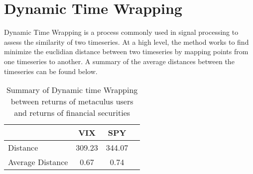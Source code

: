 \documentclass{article}
\begin{document}
\section*{Dynamic Time Wrapping}

Dynamic Time Wrapping is a process commonly used in signal processing to assess the similarity of two timeseries. At a high level, the method works to find minimize the euclidian distance between two timeseries by mapping points from one timeseries to another. A summary of the average distances between the timeseries can be found below.

\begin{table}[h]
    \centering
\begin{tabular}{l||ccc}
    \toprule
     & \textbf{VIX} & \textbf{SPY} & \\
    \midrule
    Distance & 309.23 & 344.07 \\
    Average Distance & 0.67 & 0.74\\
    \bottomrule
\end{tabular}
\caption{Summary of Dynamic time Wrapping between returns of metaculus users and returns of financial securities}
\end{table}
\end{document}
